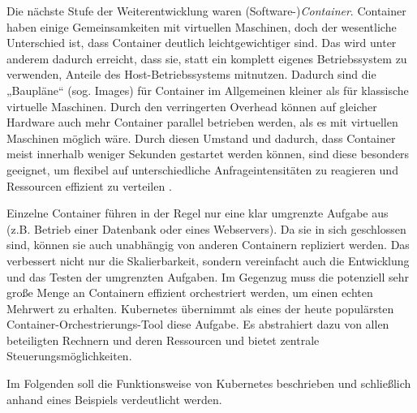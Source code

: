 \documentclass[11pt,a4paper]{article}
\begin{document}
Die nächste Stufe der Weiterentwicklung waren (Software-)\emph{Container}. Container haben einige Gemeinsamkeiten mit virtuellen Maschinen, doch der wesentliche Unterschied ist,
dass Container deutlich leichtgewichtiger sind. Das wird unter anderem dadurch erreicht, dass sie, statt ein komplett eigenes Betriebssystem zu verwenden, 
Anteile des Host-Betriebssystems mitnutzen. Dadurch sind die „Baupläne“ (sog. Images) für Container im Allgemeinen kleiner als für klassische virtuelle Maschinen.
Durch den verringerten Overhead können auf gleicher Hardware auch mehr Container parallel betrieben werden, als es mit virtuellen Maschinen möglich wäre.
Durch diesen Umstand und dadurch, dass Container meist innerhalb weniger Sekunden gestartet werden können, sind diese besonders geeignet,
um flexibel auf unterschiedliche Anfrageintensitäten zu reagieren und Ressourcen effizient zu verteilen \cite{kofler2021docker}.

Einzelne Container führen in der Regel nur eine klar umgrenzte Aufgabe aus (z.B. Betrieb einer Datenbank oder eines Webservers). Da sie in sich geschlossen sind,
können sie auch unabhängig von anderen Containern repliziert werden. Das verbessert nicht nur die Skalierbarkeit, sondern
vereinfacht auch die Entwicklung und das Testen der umgrenzten Aufgaben.
Im Gegenzug muss die potenziell sehr große Menge an Containern effizient orchestriert werden, um einen echten Mehrwert zu erhalten.
Kubernetes übernimmt als eines der heute populärsten Container-Orchestrierungs-Tool diese Aufgabe. 
Es abstrahiert dazu von allen beteiligten Rechnern und deren Ressourcen und bietet zentrale Steuerungsmöglichkeiten.
\cite{Pagani_2019}



Im Folgenden soll die Funktionsweise von Kubernetes beschrieben und schließlich anhand eines Beispiels 
verdeutlicht werden.
\end{document}
